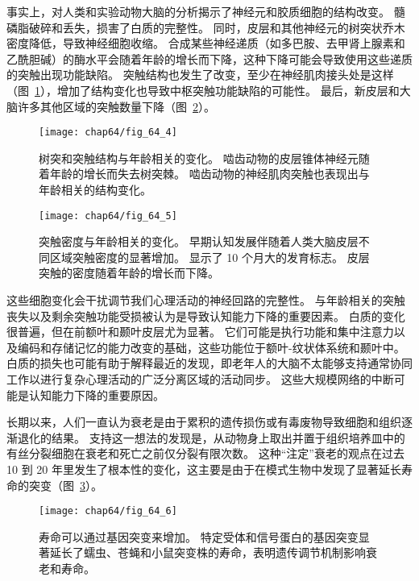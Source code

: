事实上，对人类和实验动物大脑的分析揭示了神经元和胶质细胞的结构改变。
髓磷脂破碎和丢失，损害了白质的完整性。
同时，皮层和其他神经元的树突状乔木密度降低，导致神经细胞收缩。
合成某些神经递质（如多巴胺、去甲肾上腺素和乙酰胆碱）的酶水平会随着年龄的增长而下降，这种下降可能会导致使用这些递质的突触出现功能缺陷。
突触结构也发生了改变，至少在神经肌肉接头处是这样（图~\ref{fig:64_4}），增加了结构变化也导致中枢突触功能缺陷的可能性。
最后，新皮层和大脑许多其他区域的突触数量下降（图~\ref{fig:64_5}）。


\begin{figure}[htbp]
	\centering
	\texttt{[image: chap64/fig\_64\_4]}
	\caption{树突和突触结构与年龄相关的变化。
		啮齿动物的皮层锥体神经元随着年龄的增长而失去树突棘。
		啮齿动物的神经肌肉突触也表现出与年龄相关的结构变化。}
	\label{fig:64_4}
\end{figure}


\begin{figure}[htbp]
	\centering
	\texttt{[image: chap64/fig\_64\_5]}
	\caption{突触密度与年龄相关的变化。
		早期认知发展伴随着人类大脑皮层不同区域突触密度的显著增加。
		显示了 10 个月大的发育标志。
		皮层突触的密度随着年龄的增长而下降\cite{huttenlocher2009neural}。}
	\label{fig:64_5}
\end{figure}


这些细胞变化会干扰调节我们心理活动的神经回路的完整性。
与年龄相关的突触丧失以及剩余突触功能受损被认为是导致认知能力下降的重要因素。
白质的变化很普遍，但在前额叶和颞叶皮层尤为显著。
它们可能是执行功能和集中注意力以及编码和存储记忆的能力改变的基础，这些功能位于额叶-纹状体系统和颞叶中。
白质的损失也可能有助于解释最近的发现，即老年人的大脑不太能够支持通常协同工作以进行复杂心理活动的广泛分离区域的活动同步。
这些大规模网络的中断可能是认知能力下降的重要原因。


长期以来，人们一直认为衰老是由于累积的遗传损伤或有毒废物导致细胞和组织逐渐退化的结果。
支持这一想法的发现是，从动物身上取出并置于组织培养皿中的有丝分裂细胞在衰老和死亡之前仅分裂有限次数。
这种“注定”衰老的观点在过去 10 到 20 年里发生了根本性的变化，这主要是由于在模式生物中发现了显著延长寿命的突变（图~\ref{fig:64_6}）。


\begin{figure}[htbp]
	\centering
	\texttt{[image: chap64/fig\_64\_6]}
	\caption{寿命可以通过基因突变来增加。
		特定受体和信号蛋白的基因突变显著延长了蠕虫、苍蝇和小鼠突变株的寿命，表明遗传调节机制影响衰老和寿命\cite{hekimi2003genetics,lin1998extended,brown1996dwarf}。}
	\label{fig:64_6}
\end{figure}


